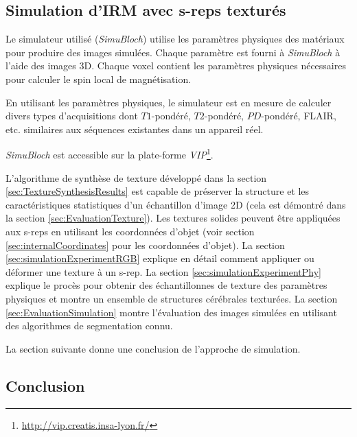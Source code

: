 \subsection{Simulation d'IRM avec s-reps texturés}

Le simulateur utilisé (\textit{SimuBloch}) utilise les paramètres physiques des matériaux pour produire des images simulées.
Chaque paramètre est fourni à \textit{SimuBloch} à l'aide des images 3D.
Chaque voxel contient les paramètres physiques nécessaires pour calculer le spin local de magnétisation.

En utilisant les paramètres physiques, le simulateur est en mesure de calculer divers types 
d'acquisitions dont $T1$-pondéré, $T2$-pondéré, $PD$-pondéré, FLAIR, etc. similaires aux séquences existantes dans un appareil réel.

\textit{SimuBloch} est accessible sur la plate-forme \textit{VIP}\footnote {\url {http://vip.creatis.insa-lyon.fr/}}.

L'algorithme de synthèse de texture développé dans la section \ref{sec:TextureSynthesisResults} est capable de
préserver la structure et les caractéristiques statistiques d'un échantillon d'image 2D (cela est démontré dans la section \ref{sec:EvaluationTexture}).
Les textures solides peuvent être appliquées aux s-reps en utilisant les coordonnées d'objet (voir section \ref{sec:internalCoordinates} pour les coordonnées d'objet).
La section \ref{sec:simulationExperimentRGB} explique en détail comment appliquer ou déformer une texture à un s-rep.
La section \ref{sec:simulationExperimentPhy} explique le procès pour obtenir des échantillonnes de texture des paramètres physiques  et montre un ensemble de structures cérébrales texturées. 
La section \ref{sec:EvaluationSimulation} montre l'évaluation des images simulées en utilisant des algorithmes de segmentation connu.

La section suivante donne une conclusion de l'approche de simulation.

\subsection{Conclusion}

